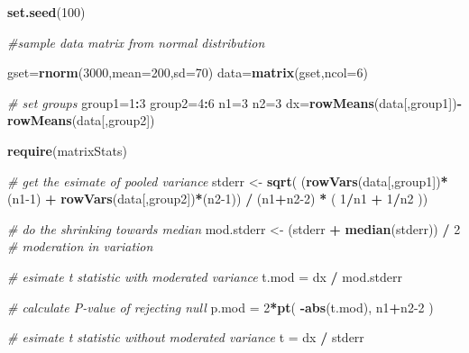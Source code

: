 \documentclass[12pt,]{krantz}
\newenvironment{Shaded}{\begin{snugshade}}{\end{snugshade}}
\newcommand{\CommentTok}[1]{\textcolor[rgb]{0.56,0.35,0.01}{\textit{#1}}}
\newcommand{\DataTypeTok}[1]{\textcolor[rgb]{0.13,0.29,0.53}{#1}}
\newcommand{\DecValTok}[1]{\textcolor[rgb]{0.00,0.00,0.81}{#1}}
\newcommand{\KeywordTok}[1]{\textcolor[rgb]{0.13,0.29,0.53}{\textbf{#1}}}
\newcommand{\NormalTok}[1]{#1}
\newcommand{\OperatorTok}[1]{\textcolor[rgb]{0.81,0.36,0.00}{\textbf{#1}}}
\newcommand{\StringTok}[1]{\textcolor[rgb]{0.31,0.60,0.02}{#1}}
\theoremstyle{definition}
\theoremstyle{definition}
\theoremstyle{definition}
\theoremstyle{remark}
\begin{document}
\begin{Shaded}
\begin{Highlighting}[]
\KeywordTok{set.seed}\NormalTok{(}\DecValTok{100}\NormalTok{)}

\CommentTok{#sample data matrix from normal distribution}

\NormalTok{gset=}\KeywordTok{rnorm}\NormalTok{(}\DecValTok{3000}\NormalTok{,}\DataTypeTok{mean=}\DecValTok{200}\NormalTok{,}\DataTypeTok{sd=}\DecValTok{70}\NormalTok{)}
\NormalTok{data=}\KeywordTok{matrix}\NormalTok{(gset,}\DataTypeTok{ncol=}\DecValTok{6}\NormalTok{)}

\CommentTok{# set groups}
\NormalTok{group1=}\DecValTok{1}\OperatorTok{:}\DecValTok{3}
\NormalTok{group2=}\DecValTok{4}\OperatorTok{:}\DecValTok{6}
\NormalTok{n1=}\DecValTok{3}
\NormalTok{n2=}\DecValTok{3}
\NormalTok{dx=}\KeywordTok{rowMeans}\NormalTok{(data[,group1])}\OperatorTok{-}\KeywordTok{rowMeans}\NormalTok{(data[,group2])}
  
\KeywordTok{require}\NormalTok{(matrixStats)}

\CommentTok{# get the esimate of pooled variance }
\NormalTok{stderr <-}\StringTok{ }\KeywordTok{sqrt}\NormalTok{( (}\KeywordTok{rowVars}\NormalTok{(data[,group1])}\OperatorTok{*}\NormalTok{(n1}\DecValTok{-1}\NormalTok{) }\OperatorTok{+}\StringTok{ }\KeywordTok{rowVars}\NormalTok{(data[,group2])}\OperatorTok{*}\NormalTok{(n2}\DecValTok{-1}\NormalTok{)) }\OperatorTok{/}\StringTok{ }\NormalTok{(n1}\OperatorTok{+}\NormalTok{n2}\DecValTok{-2}\NormalTok{) }\OperatorTok{*}\StringTok{ }\NormalTok{( }\DecValTok{1}\OperatorTok{/}\NormalTok{n1 }\OperatorTok{+}\StringTok{ }\DecValTok{1}\OperatorTok{/}\NormalTok{n2 ))}

\CommentTok{# do the shrinking towards median}
\NormalTok{mod.stderr <-}\StringTok{ }\NormalTok{(stderr }\OperatorTok{+}\StringTok{ }\KeywordTok{median}\NormalTok{(stderr)) }\OperatorTok{/}\StringTok{ }\DecValTok{2} \CommentTok{# moderation in variation}

\CommentTok{# esimate t statistic with moderated variance}
\NormalTok{t.mod =}\StringTok{ }\NormalTok{dx }\OperatorTok{/}\StringTok{ }\NormalTok{mod.stderr}

\CommentTok{# calculate P-value of rejecting null }
\NormalTok{p.mod =}\StringTok{ }\DecValTok{2}\OperatorTok{*}\KeywordTok{pt}\NormalTok{( }\OperatorTok{-}\KeywordTok{abs}\NormalTok{(t.mod), n1}\OperatorTok{+}\NormalTok{n2}\DecValTok{-2}\NormalTok{ )}

\CommentTok{# esimate t statistic without moderated variance}
\NormalTok{t =}\StringTok{ }\NormalTok{dx }\OperatorTok{/}\StringTok{ }\NormalTok{stderr}


\end{Highlighting}
\end{Shaded}
\end{document}
